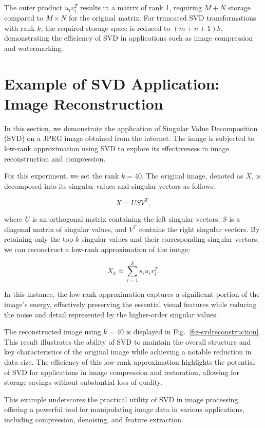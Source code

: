 \documentclass[
  journal,
]{IEEEtran}%
\begin{document}
The outer product \(u_i v_i^T\) results in a matrix of rank 1, requiring
\(M + N\) storage compared to \(M \times N\) for the original matrix.
For truncated SVD transformations with rank \(k\), the required storage
space is reduced to \((m+n+1)k\), demonstrating the efficiency of SVD in
applications such as image compression and watermarking.

\section{Example of SVD Application: Image
Reconstruction}\label{example-of-svd-application-image-reconstruction}

In this section, we demonstrate the application of Singular Value
Decomposition (SVD) on a JPEG image obtained from the internet. The
image is subjected to low-rank approximation using SVD to explore its
effectiveness in image reconstruction and compression.

For this experiment, we set the rank \(k = 40\). The original image,
denoted as \(X\), is decomposed into its singular values and singular
vectors as follows:

\[
X = U S V^T,
\]

where \(U\) is an orthogonal matrix containing the left singular
vectors, \(S\) is a diagonal matrix of singular values, and \(V^T\)
contains the right singular vectors. By retaining only the top \(k\)
singular values and their corresponding singular vectors, we can
reconstruct a low-rank approximation of the image:

\[
X_k \approx \sum_{i=1}^{k} s_i u_i v_i^T.
\]

In this instance, the low-rank approximation captures a significant
portion of the image's energy, effectively preserving the essential
visual features while reducing the noise and detail represented by the
higher-order singular values.

The reconstructed image using \(k = 40\) is displayed in
Fig.~\ref{fig-svdreconstruction}. This result illustrates the ability of
SVD to maintain the overall structure and key characteristics of the
original image while achieving a notable reduction in data size. The
efficiency of this low-rank approximation highlights the potential of
SVD for applications in image compression and restoration, allowing for
storage savings without substantial loss of quality.

This example underscores the practical utility of SVD in image
processing, offering a powerful tool for manipulating image data in
various applications, including compression, denoising, and feature
extraction.
\end{document}
